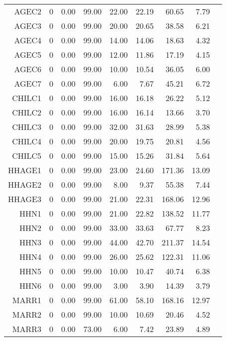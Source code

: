 \begin{longtable}{|rrrrrrrrr|}
	AGEC2  &  0  &  0.00  &  99.00  &  22.00  &  22.19  &  60.65  &  7.79 & \\
	AGEC3  &  0  &  0.00  &  99.00  &  20.00  &  20.65  &  38.58  &  6.21 & \\
	AGEC4  &  0  &  0.00  &  99.00  &  14.00  &  14.06  &  18.63  &  4.32 & \\
	AGEC5  &  0  &  0.00  &  99.00  &  12.00  &  11.86  &  17.19  &  4.15 & \\
	AGEC6  &  0  &  0.00  &  99.00  &  10.00  &  10.54  &  36.05  &  6.00 & \\
	AGEC7  &  0  &  0.00  &  99.00  &  6.00  &  7.67  &  45.21  &  6.72 & \\
	CHILC1  &  0  &  0.00  &  99.00  &  16.00  &  16.18  &  26.22  &  5.12 & \\
	CHILC2  &  0  &  0.00  &  99.00  &  16.00  &  16.14  &  13.66  &  3.70 & \\
	CHILC3  &  0  &  0.00  &  99.00  &  32.00  &  31.63  &  28.99  &  5.38 & \\
	CHILC4  &  0  &  0.00  &  99.00  &  20.00  &  19.75  &  20.81  &  4.56 & \\
	CHILC5  &  0  &  0.00  &  99.00  &  15.00  &  15.26  &  31.84  &  5.64 & \\
	HHAGE1  &  0  &  0.00  &  99.00  &  23.00  &  24.60  &  171.36  &  13.09 & \\
	HHAGE2  &  0  &  0.00  &  99.00  &  8.00  &  9.37  &  55.38  &  7.44 & \\
	HHAGE3  &  0  &  0.00  &  99.00  &  21.00  &  22.31  &  168.06  &  12.96 & \\
	HHN1  &  0  &  0.00  &  99.00  &  21.00  &  22.82  &  138.52  &  11.77 & \\
	HHN2  &  0  &  0.00  &  99.00  &  33.00  &  33.63  &  67.77  &  8.23 & \\
	HHN3  &  0  &  0.00  &  99.00  &  44.00  &  42.70  &  211.37  &  14.54 & \\
	HHN4  &  0  &  0.00  &  99.00  &  26.00  &  25.62  &  122.31  &  11.06 & \\
	HHN5  &  0  &  0.00  &  99.00  &  10.00  &  10.47  &  40.74  &  6.38 & \\
	HHN6  &  0  &  0.00  &  99.00  &  3.00  &  3.90  &  14.39  &  3.79 & \\
	MARR1  &  0  &  0.00  &  99.00  &  61.00  &  58.10  &  168.16  &  12.97 & \\
	MARR2  &  0  &  0.00  &  99.00  &  10.00  &  10.69  &  20.46  &  4.52 & \\
	MARR3  &  0  &  0.00  &  73.00  &  6.00  &  7.42  &  23.89  &  4.89 & \\

\end{longtable}
